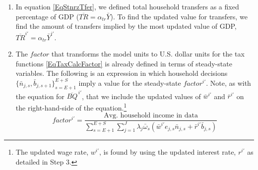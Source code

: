 \begin{enumerate}
\begin{enumerate}
      \item In equation \eqref{EqStnrzTfer}, we defined total household transfers as a fixed percentage of GDP ($\overline{TR}=\alpha_{tr}\bar{Y}$).  To find the updated value for transfers, we find the amount of transfers implied by the most updated value of GDP, $\overline{TR}^{i'}=\alpha_{tr}\bar{Y}^{i'}$.




      \item The $factor$ that transforms the model units to U.S. dollar units for the tax functions \eqref{EqTaxCalcFactor} is already defined in terms of steady-state variables. The following is an expression in which household decisions $\{\bar{n}_{j,s},\bar{b}_{j,s+1}\}_{s=E+1}^{E+S}$ imply a value for the steady-state $factor^{i'}$. Note, as with the equation for $\overline{BQ}^{\,i'}$, that we include the updated values of $\bar{w}^{i'}$ and $\bar{r}^{i'}$ on the right-hand-side of the equation.\footnote{The updated wage rate, $w^{i'}$, is found by using the updated interest rate, $r^{i'}$ as detailed in Step 3.}
      \begin{equation*}
        factor^{i'} = \frac{\text{Avg. household income in data}}{\sum_{s=E+1}^{E+S}\sum_{j=1}^J\lambda_j\bar{\omega}_s\left(\bar{w}^{i'}e_{j,s}\bar{n}_{j,s} + \bar{r}^{i'}\bar{b}_{j,s}\right)}
      \end{equation*}


\end{enumerate}
\end{enumerate}
